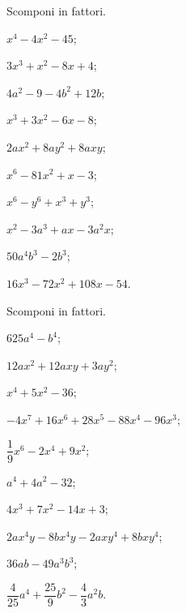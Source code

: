 \begin{esercizio}
 Scomponi in fattori.
 \begin{multicols}{2}
 \begin{enumeratea}
\item $x^{4} - 4x^{2} - 45$;
\item $3x^{3} + x^{2} - 8x + 4$;
\item $4a^{2} - 9 - 4b^{2} + 12b $;
\item $x^{3} + 3x^{2} - 6x - 8$;
\item $2ax^{2} + 8ay^{2} + 8axy$;
\item $x^{6} - 81x^{2} + x - 3$;
\item $x^{6} - y^{6} + x^{3} + y^{3}$;
\item $x^{2} - 3a^{3} + ax - 3a^{2}x$;
\item $50a^{4}b^{3} - 2b^{3}$;
\item $16x^{3}-72x^{2}+108x-54$.
 \end{enumeratea}
 \end{multicols}
\end{esercizio}

\begin{esercizio}
 Scomponi in fattori.
 \begin{multicols}{2}
 \begin{enumeratea}
\item $625a^{4} - b^{4}$;
\item $12ax^{2}+12{axy}+3{ay}^{2}$;
\item $x^{4} + 5x^{2} - 36$;
\item $-4x^{7} + 16x^{6} + 28x^{5} - 88x^{4} - 96x^{3}$;
\item $\dfrac{1}{9}x^6 - 2x^{4} + 9x^{2}$;
\item $a^{4} + 4a^{2} - 32$;
\item $4x^{3} + 7x^{2} - 14x + 3$;
\item $2ax^{4}y - 8bx^{4}y - 2axy^{4} + 8bxy^{4}$;
\item $36ab - 49a^{3}b^{3}$;
\item $\dfrac{4}{25}a^4+\dfrac{25}{9}b^2-\dfrac{4}{3}a^{2}b$.
 \end{enumeratea}
 \end{multicols}
\end{esercizio}

